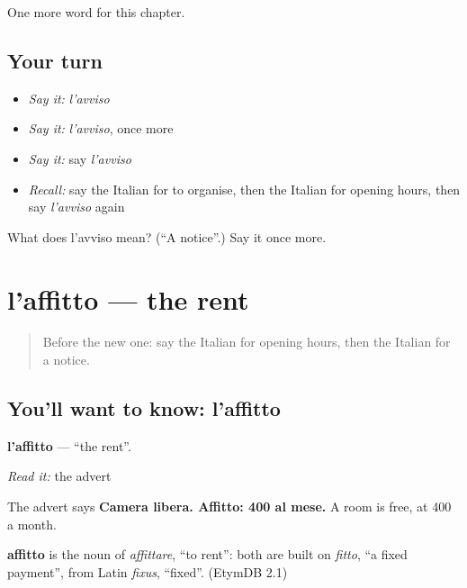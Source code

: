\begin{grammarlens}[title={What you've built}]
One more word for this chapter.
\end{grammarlens}

\subsection*{Your turn}
\begin{itemize}
\raggedright
  \item \emph{Say it:} \emph{l'avviso}
  \item \emph{Say it:} \emph{l'avviso}, once more
  \item \emph{Say it:} say \emph{l'avviso}
  \item \emph{Recall:} say the Italian for to organise, then the Italian for opening hours, then say \emph{l'avviso} again
\end{itemize}

\begin{tcolorbox}[breakable,colback=teal!4,colframe=teal!35!black,title={Before you move on}]
What does l'avviso mean? (\textquotedblleft{}A notice\textquotedblright{}.) Say it once more.
\end{tcolorbox}
\section[l'affitto]{l'affitto — the rent}

\label{lesson:IT-C139-laffitto}



\begin{quote}
Before the new one: say the Italian for opening hours, then the Italian for a notice.
\end{quote}

\subsection*{You'll want to know: l'affitto}
\textbf{l'affitto} — \textquotedblleft{}the rent\textquotedblright{}.

\emph{Read it:} the advert

The advert says \textbf{Camera libera. Affitto: 400 al mese.} A room is free, at 400 a month.

\begin{cousinweb}
\textbf{affitto} is the noun of \emph{affittare}, \textquotedblleft{}to rent\textquotedblright{}: both are built on \emph{fitto}, \textquotedblleft{}a fixed payment\textquotedblright{}, from Latin \emph{fixus}, \textquotedblleft{}fixed\textquotedblright{}. (EtymDB 2.1)
\end{cousinweb}

